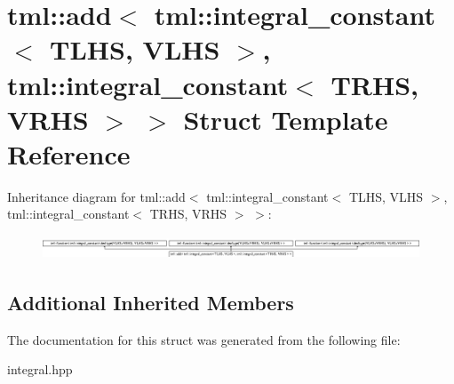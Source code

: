 \hypertarget{structtml_1_1add_3_01tml_1_1integral__constant_3_01TLHS_00_01VLHS_01_4_00_01tml_1_1integral__con269648d0288080cfcff4761e1d9fec72}{\section{tml\+:\+:add$<$ tml\+:\+:integral\+\_\+constant$<$ T\+L\+H\+S, V\+L\+H\+S $>$, tml\+:\+:integral\+\_\+constant$<$ T\+R\+H\+S, V\+R\+H\+S $>$ $>$ Struct Template Reference}
\label{structtml_1_1add_3_01tml_1_1integral__constant_3_01TLHS_00_01VLHS_01_4_00_01tml_1_1integral__con269648d0288080cfcff4761e1d9fec72}
}
Inheritance diagram for tml\+:\+:add$<$ tml\+:\+:integral\+\_\+constant$<$ T\+L\+H\+S, V\+L\+H\+S $>$, tml\+:\+:integral\+\_\+constant$<$ T\+R\+H\+S, V\+R\+H\+S $>$ $>$\+:\begin{figure}[H]
\begin{center}
\leavevmode
\includegraphics[height=0.711111cm]{structtml_1_1add_3_01tml_1_1integral__constant_3_01TLHS_00_01VLHS_01_4_00_01tml_1_1integral__con269648d0288080cfcff4761e1d9fec72}
\end{center}
\end{figure}
\subsection*{Additional Inherited Members}


The documentation for this struct was generated from the following file\+:\begin{DoxyCompactItemize}
\item 
integral.\+hpp\end{DoxyCompactItemize}

